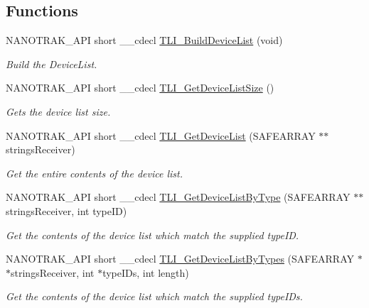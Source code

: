 \subsection*{Functions}
\begin{DoxyCompactItemize}
\item 
N\+A\+N\+O\+T\+R\+A\+K\+\_\+\+A\+PI short \+\_\+\+\_\+cdecl \hyperlink{group___benchtop_nano_trak_gaefbb72e39fe49308163f8453a0e5631b}{T\+L\+I\+\_\+\+Build\+Device\+List} (void)
\begin{DoxyCompactList}\small\item\em Build the Device\+List. \end{DoxyCompactList}\item 
N\+A\+N\+O\+T\+R\+A\+K\+\_\+\+A\+PI short \+\_\+\+\_\+cdecl \hyperlink{group___benchtop_nano_trak_gabf6dcf80082ce537f5e57f55086cee2c}{T\+L\+I\+\_\+\+Get\+Device\+List\+Size} ()
\begin{DoxyCompactList}\small\item\em Gets the device list size. \end{DoxyCompactList}\item 
N\+A\+N\+O\+T\+R\+A\+K\+\_\+\+A\+PI short \+\_\+\+\_\+cdecl \hyperlink{group___benchtop_nano_trak_ga987f5b3e524ce131617d1b043f89a79a}{T\+L\+I\+\_\+\+Get\+Device\+List} (S\+A\+F\+E\+A\+R\+R\+AY $\ast$$\ast$strings\+Receiver)
\begin{DoxyCompactList}\small\item\em Get the entire contents of the device list. \end{DoxyCompactList}\item 
N\+A\+N\+O\+T\+R\+A\+K\+\_\+\+A\+PI short \+\_\+\+\_\+cdecl \hyperlink{group___benchtop_nano_trak_gab3a1a58215614627f9d218484ef91b9d}{T\+L\+I\+\_\+\+Get\+Device\+List\+By\+Type} (S\+A\+F\+E\+A\+R\+R\+AY $\ast$$\ast$strings\+Receiver, int type\+ID)
\begin{DoxyCompactList}\small\item\em Get the contents of the device list which match the supplied type\+ID. \end{DoxyCompactList}\item 
N\+A\+N\+O\+T\+R\+A\+K\+\_\+\+A\+PI short \+\_\+\+\_\+cdecl \hyperlink{group___benchtop_nano_trak_ga779abd99fb6e2e68fcd7586ea2d2d742}{T\+L\+I\+\_\+\+Get\+Device\+List\+By\+Types} (S\+A\+F\+E\+A\+R\+R\+AY $\ast$$\ast$strings\+Receiver, int $\ast$type\+I\+Ds, int length)
\begin{DoxyCompactList}\small\item\em Get the contents of the device list which match the supplied type\+I\+Ds. \end{DoxyCompactList}\item 
$$
\end{DoxyCompactItemize}
